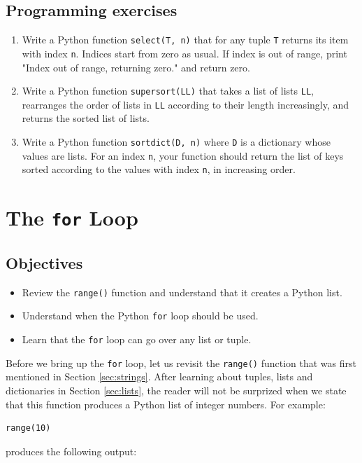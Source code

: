 \subsection{Programming exercises}

\begin{enumerate}
\item Write a Python function {\tt select(T, n)} that for any tuple {\tt T}
      returns its item with index {\tt n}. Indices start from zero as usual.
      If index is out of range, print "Index out of range, returning zero." and 
      return zero.
\item Write a Python function {\tt supersort(LL)} that takes a list of lists {\tt LL}, 
      rearranges the order of lists in {\tt LL} according to their length increasingly,
      and returns the sorted list of lists. 
\item Write a Python function {\tt sortdict(D, n)} where {\tt D} is a dictionary whose values 
      are lists. For an index {\tt n}, your function should return the list of keys sorted 
      according to the values with index {\tt n}, in increasing order. 
\end{enumerate}

\section{The {\tt for} Loop} \label{sec:forloop}

\subsection{Objectives}

\begin{itemize}
\item Review the {\tt range()} function and understand that it creates a Python list.
\item Understand when the Python {\tt for} loop should be used.
\item Learn that the {\tt for} loop can go over any list or tuple.
\end{itemize}
Before we bring up the {\tt for} loop, let us revisit the {\tt range()}
function that was first mentioned in Section \ref{sec:strings}. After 
learning about tuples, lists and dictionaries in Section \ref{sec:lists}, the 
reader will not be surprized when we state that this function produces 
a Python list of integer numbers. For example:

\begin{verbatim}
range(10)
\end{verbatim}
produces the following output:

